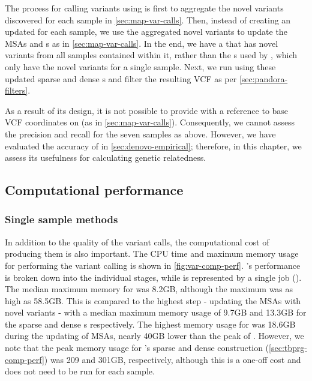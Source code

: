 The process for calling variants using \compare{} is first to aggregate the novel variants discovered for each sample in \autoref{sec:map-var-calls}. Then, instead of creating an updated \panrg{} for each sample, we use the aggregated novel variants to update the MSAs and \prg{}s as in \autoref{sec:map-var-calls}. In the end, we have a \panrg{} that has novel variants from all samples contained within it, rather than the \prg{}s used by \pandora{} , which only have the novel variants for a single sample. Next, we run  using these updated sparse and dense \panrg{}s and filter the resulting VCF as per \autoref{sec:pandora-filters}. 

As a result of its design, it is not possible to provide \compare{} with a reference to base VCF coordinates on (as in \autoref{sec:map-var-calls}). Consequently, we cannot assess the precision and recall for the seven samples as above. However, we have evaluated the accuracy of \compare{} in \autoref{sec:denovo-empirical}; therefore, in this chapter, we assess its usefulness for calculating genetic relatedness.

\subsection{Computational performance}
\label{sec:var-call-comp-perf}

\subsubsection{Single sample methods}
In addition to the quality of the variant calls, the computational cost of producing them is also important. The CPU time and maximum memory usage for performing the \ont{} variant calling is shown in \autoref{fig:var-comp-perf}. \pandora{}'s performance is broken down into the individual stages, while \bcftools{} is represented by a single job (). The median maximum memory for \bcftools{} was 8.2GB, although the maximum was as high as 58.5GB. This is compared to the highest \pandora{} step - updating the MSAs with novel variants - with a median maximum memory usage of 9.7GB and 13.3GB for the sparse and dense \panrg{}s respectively. The highest memory usage for \pandora{} was 18.6GB during the updating of MSAs, nearly 40GB lower than the peak of \bcftools{}. However, we note that the peak memory usage for \pandora{}'s sparse and dense \panrg{} construction (\autoref{sec:tbprg-comp-perf}) was 209 and 301GB, respectively, although this is a one-off cost and does not need to be run for each sample. 

